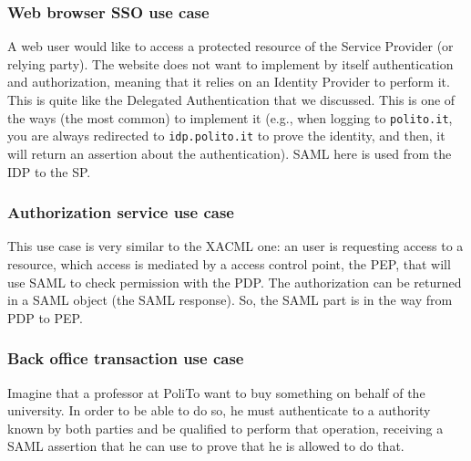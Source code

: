 \subsubsection{Web browser SSO use case}
A web user would like to access a protected resource of the Service
Provider (or relying party). The website does not want to implement by
itself authentication and authorization, meaning that it relies on an
Identity Provider to perform it. This is quite like the Delegated
Authentication that we discussed. This is one of the ways (the most
common) to implement it (e.g., when logging to \texttt{polito.it}, you
are always redirected to \texttt{idp.polito.it} to prove the identity,
and then, it will return an assertion about the authentication). SAML
here is used from the IDP to the SP.

\subsubsection{Authorization service use case}
This use case is very similar to the XACML one: an user is requesting
access to a resource, which access is mediated by a access control
point, the PEP, that will use SAML to check permission with the PDP.
The authorization can be returned in a SAML object (the SAML
response). So, the SAML part is in the way from PDP to PEP.

\subsubsection{Back office transaction use case}
Imagine that a professor at PoliTo want to buy something on behalf of
the university. In order to be able to do so, he must authenticate to
a authority known by both parties and be qualified to perform that
operation, receiving a SAML assertion that he can use to prove that he 
is allowed to do that. 

